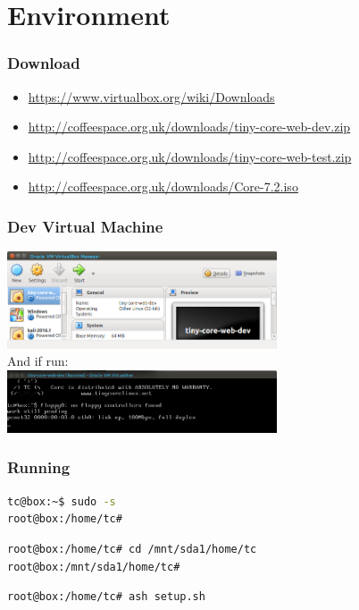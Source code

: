 \documentclass[10pt]{beamer}
\begin{document}
  \section[Env]{Environment}
  \begin{frame}
    \frametitle{Download}
    \begin{itemize}
      \item \url{https://www.virtualbox.org/wiki/Downloads}
      \item \url{http://coffeespace.org.uk/downloads/tiny-core-web-dev.zip}
      \item \url{http://coffeespace.org.uk/downloads/tiny-core-web-test.zip}
      \item \url{http://coffeespace.org.uk/downloads/Core-7.2.iso}
    \end{itemize}
  \end{frame}
  \begin{frame}
    \frametitle{Dev Virtual Machine}
    \centering
    \includegraphics[width=8cm,keepaspectratio]{tiny-core-vm.png}
    \\
    And if run:
    \\
    \includegraphics[width=8cm,keepaspectratio]{tiny-core-run.png}
  \end{frame}
  \begin{frame}[fragile=singleslide]
    \frametitle{Running}
    \centering
    \begin{lstlisting}[caption=Root Access,language=Bash]
tc@box:~$ sudo -s
root@box:/home/tc#
    \end{lstlisting}
    \begin{lstlisting}[caption=Saveable Location,language=Bash]
root@box:/home/tc# cd /mnt/sda1/home/tc
root@box:/mnt/sda1/home/tc#
    \end{lstlisting}
    \begin{lstlisting}[caption=Setup Network,language=Bash]
root@box:/home/tc# ash setup.sh
    \end{lstlisting}
  \end{frame}
\end{document}
